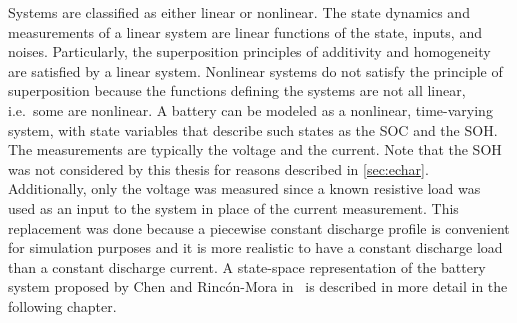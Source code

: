 \documentclass[../zhang_thesis.tex]{subfiles}
\begin{document}
Systems are classified as either linear or nonlinear. The state dynamics and measurements of a linear system are linear functions of the state, inputs, and noises. Particularly, the superposition principles of additivity and homogeneity are satisfied by a linear system. Nonlinear systems do not satisfy the principle of superposition because the functions defining the systems are not all linear, i.e.\ some are nonlinear. A battery can be modeled as a nonlinear, time-varying system,
with state variables that describe such states as the SOC and the SOH. The measurements are typically the voltage and the current. Note that the SOH was not considered by this thesis for reasons described in \cref{sec:echar}. Additionally, only the voltage was measured since a known resistive load was used as an input to the system in place of the current measurement. This replacement was done because a piecewise constant discharge profile is convenient for simulation purposes and it is
more realistic to have a constant discharge load than a constant discharge current. A state-space representation of the battery system proposed by Chen and Rinc\'on-Mora in~\cite{chen06} is described in more detail in the following chapter.

\end{document}

